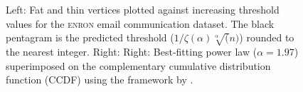 \begin{figure}[!ht]
\centering
{}%
%
\caption{Left: Fat and thin vertices plotted against increasing threshold values for the \textsc{enron} email communication dataset. The black pentagram is the predicted threshold ($1/\zeta(\alpha)\sqrt[\alpha](n)$) rounded to the nearest integer. Right: Right: Best-fitting power law ($\alpha = 1.97$)  superimposed on the complementary cumulative distribution function (CCDF) using the framework by \cite{clauset2009power}.}
\label{fig:enron}%
\end{figure}

